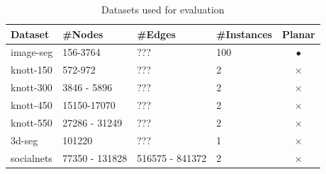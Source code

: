 \documentclass[10pt,twocolumn,letterpaper]{article}
\theoremstyle{definition}
\begin{document}
\begin{table}[H]
   \tiny
   \centering
   \caption{Datasets used for evaluation}
   \label{tab:instance_sizes}
   \begin{tabular}{llllc}
      \toprule
         Dataset          &     \#Nodes     & \#Edges  & \#Instances  & Planar        \\ 
      \midrule 
         image-seg        &     156-3764        & ???              & 100          & $\bullet$    \\ 
         knott-150        &     572-972         & ???              & 2            & $\times$ \\
         knott-300        &     3846 - 5896     & ???              & 2            & $\times$ \\
         knott-450        &     15150-17070     & ???              & 2            & $\times$ \\
         knott-550        &     27286 - 31249   & ???              & 2            & $\times$ \\
         3d-seg           &     101220          & ???              & 1            & $\times$ \\
         socialnets       &     77350 - 131828  & 516575 - 841372  & 2            & $\times$ \\  
      \bottomrule
   \end{tabular}
\end{table}
\end{document}

